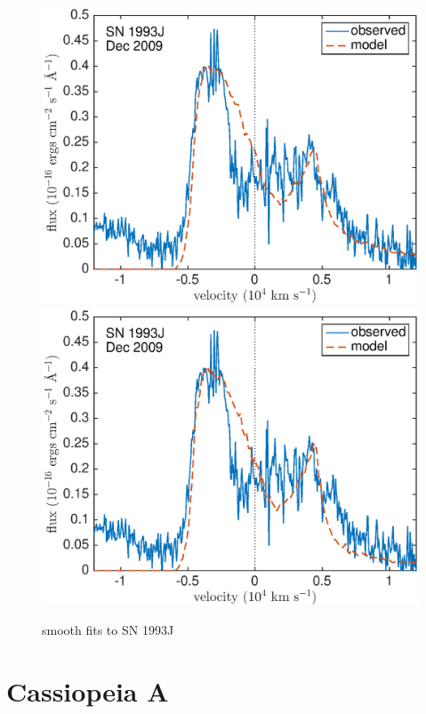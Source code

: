 \begin{figure}
\includegraphics[scale=0.4,clip=true, trim=20 0 40 20]{chapters/chapter6/figs/93J/smooth/OII}
\includegraphics[scale=0.4,clip=true, trim=20 0 40 20]{chapters/chapter6/figs/93J/smooth/OII_amC}
\caption{smooth fits to SN 1993J}
\label{93J_smooth}
\end{figure}

\clearpage

\section{Cassiopeia A}

